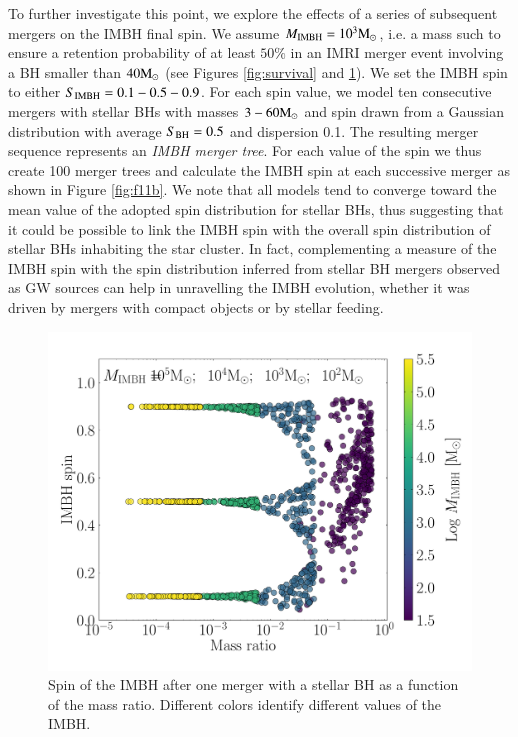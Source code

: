 \documentclass[article]{aa}
\newcommand{\Ms}{{\rm M}_\odot}
\newcommand{\ibh}{{\rm IMBH}}
\newcommand{\bh}{{\rm BH}}
\begin{document}
{To further investigate this point, we explore the effects of a series of subsequent mergers on the IMBH final spin. We assume $M_\ibh = 10^3\Ms$, i.e. a mass such to ensure a retention probability of at least $50\%$ in an IMRI merger event involving a BH smaller than $40\Ms$ (see Figures  \ref{fig:survival} and \ref{fig:f11a}). We set the IMBH spin to either $S_\ibh = 0.1-0.5-0.9$. For each spin value, we model ten consecutive mergers with stellar BHs with masses $3-60\Ms$ and spin drawn from a Gaussian distribution with average $S_\bh = 0.5$ and dispersion 0.1. The resulting merger sequence represents an {\it IMBH merger tree}. For each value of the spin we thus create 100 merger trees and calculate the IMBH spin at each successive merger as shown in Figure \ref{fig:f11b}.
We note that all models tend to converge toward the mean value of the adopted spin distribution for stellar BHs, thus suggesting that it could be possible to link the IMBH spin with the overall spin distribution of stellar BHs inhabiting the star cluster. In fact, complementing a measure of the IMBH spin with the spin distribution inferred from stellar BH mergers observed as GW sources can help in unravelling the IMBH evolution, whether it was driven by mergers with compact objects or by stellar feeding.
}

\begin{figure}
\centering
\includegraphics[width=\columnwidth]{track}
\caption{Spin of the IMBH after one merger with a stellar BH as a function of the mass ratio. Different colors identify different values of the IMBH.}
\label{fig:f11a}
\end{figure}
\end{document}

